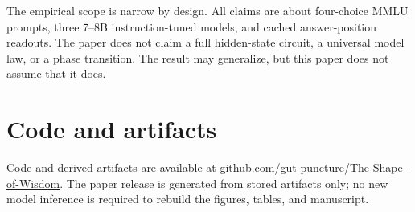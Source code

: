 \documentclass[10pt,twocolumn]{article}
\begin{document}
The empirical scope is narrow by design. All claims are about four-choice MMLU prompts, three 7--8B instruction-tuned models, and cached answer-position readouts. The paper does not claim a full hidden-state circuit, a universal model law, or a phase transition. The result may generalize, but this paper does not assume that it does.

\section*{Code and artifacts}

Code and derived artifacts are available at \href{https://github.com/gut-puncture/The-Shape-of-Wisdom}{github.com/gut-puncture/The-Shape-of-Wisdom}. The paper release is generated from stored artifacts only; no new model inference is required to rebuild the figures, tables, and manuscript.

\balance


\end{document}
